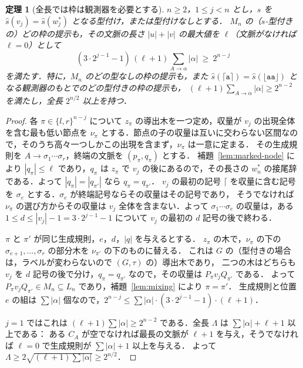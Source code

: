 \documentclass[11pt,a4paper]{ltjsarticle}
\numberwithin{equation}{section}
\theoremstyle{plain}
\newtheorem{theorem}{定理}[section]
\theoremstyle{definition}
\theoremstyle{remark}
\theoremstyle{plain}
\newcommand{\Lfl}{\lfloor}
\newcommand{\Rfl}{\rfloor}
\newcommand{\Lce}{\lceil}
\newcommand{\Rce}{\rceil}
\newcommand{\ta}{\mathtt a}
\begin{document}
\begin{theorem}[全長では枠は観測器を必要とする]\label{thm:frame-total}
$n\ge2$，$1\le j<n$ とし，$s$ を $\widehat s(v_j)=\widehat s(w^*_j)$ となる型付け，または型付けなしとする．
$M_n$ の（$s$-型付きの）どの枠の提示も，その文脈の長さ $|u|+|v|$ の最大値を $\ell$（文脈がなければ $\ell=0$）として
\[
(3\cdot2^{j-1}-1)\,(\ell+1)\sum_{A\to\alpha}|\alpha|\ \ge\ 2^{n-j}
\]
を満たす．特に，$M_n$ のどの型なしの枠の提示も，また $\widehat s(\Lce\ta\Rce)=\widehat s(\Lfl\ta\ta\Rfl)$ となる観測器のもとでのどの型付きの枠の提示も，
$(\ell+1)\sum_{A\to\alpha}|\alpha|\ge2^{n-2}$ を満たし，全長 $2^{n/2}$ 以上を持つ．
\end{theorem}
\begin{proof}
各 $\pi\in\{l,r\}^{n-j}$ について $z_\pi$ の導出木を一つ定め，収量が $v_j$ の出現全体を含む最も低い節点を $\nu_\pi$ とする．節点の子の収量は互いに交わらない区間なので，そのうち高々一つしかこの出現を含まず，$\nu_\pi$ は一意に定まる．
その生成規則を $A\to\sigma_1\cdots\sigma_r$，終端の文脈を $(p_\pi,q_\pi)$ とする．
補題~\ref{lem:marked-node} により $|q_\pi|\le\ell$ であり，$q_\pi$ は $z_\pi$ で $v_j$ の後にあるので，その長さの $w^*_n$ の接尾辞である．よって $|q_\pi|=|q_{\pi'}|$ なら $q_\pi=q_{\pi'}$．
$v_j$ の最初の記号 $\Lce$ を収量に含む記号を $\sigma_e$ とする．$\sigma_e$ が終端記号ならその収量はその記号であり，
そうでなければ $\nu_\pi$ の選び方からその収量は $v_j$ 全体を含まない．よって $\sigma_1\cdots\sigma_e$ の収量は，ある $1\le d\le|v_j|-1=3\cdot2^{j-1}-1$ について $v_j$ の最初の $d$ 記号の後で終わる．

$\pi$ と $\pi'$ が同じ生成規則，$e$，$d$，$|q|$ を与えるとする．
$z_\pi$ の木で，$\nu_\pi$ の下の $\sigma_{e+1},\dots,\sigma_r$ の部分木を $\nu_{\pi'}$ の下のものに替える．
これは $G$ の（型付きの場合は，ラベルが変わらないので $(G,\tau)$ の）導出木であり，
二つの木はどちらも $v_j$ を $d$ 記号の後で分け，$q_\pi=q_{\pi'}$ なので，その収量は $P_\pi v_jQ_{\pi'}$ である．
よって $P_\pi v_jQ_{\pi'}\in M_n\subseteq L_n$ であり，補題~\ref{lem:mixing} により $\pi=\pi'$．
生成規則と位置 $e$ の組は $\sum|\alpha|$ 個なので，$2^{n-j}\le\sum|\alpha|\cdot(3\cdot2^{j-1}-1)\cdot(\ell+1)$．

$j=1$ ではこれは $(\ell+1)\sum|\alpha|\ge2^{n-2}$ である．全長 $\Lambda$ は $\sum|\alpha|+\ell+1$ 以上である：
ある $C_A$ が空でなければ最長の文脈が $\ell+1$ を与え，そうでなければ $\ell=0$ で生成規則が $\sum|\alpha|+1$ 以上を与える．
よって $\Lambda\ge2\sqrt{(\ell+1)\sum|\alpha|}\ge2^{n/2}$．
\end{proof}
\end{document}
